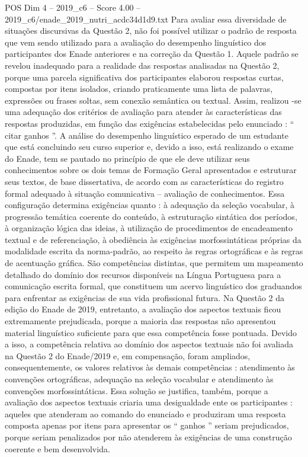 \begin{textsample}{POS Dim 4 – 2019\_c6 – Score 4.00 – 2019\_c6/enade\_2019\_nutri\_acdc34d1d9.txt}
Para avaliar essa diversidade de situações discursivas da Questão 2, não foi possível utilizar o padrão de resposta que vem sendo utilizado para a avaliação do desempenho linguístico dos participantes dos Enade anteriores e na correção da Questão 1.
Aquele padrão se revelou inadequado para a realidade das respostas analisadas na Questão 2, porque uma parcela significativa dos participantes elaborou respostas curtas, compostas por itens isolados, criando praticamente uma lista de palavras, expressões ou frases soltas, sem conexão semântica ou textual.
Assim, realizou -se uma adequação dos critérios de avaliação para atender às características das respostas produzidas, em função das exigências estabelecidas pelo enunciado : “ citar ganhos ”.
A análise do desempenho linguístico esperado de um estudante que está concluindo seu curso superior e, devido a isso, está realizando o exame do Enade, tem se pautado no princípio de que ele deve utilizar seus conhecimentos sobre os dois temas de Formação Geral apresentados e estruturar seus textos, de base dissertativa, de acordo com as características do registro formal adequado à situação comunicativa – avaliação de conhecimentos.
Essa configuração determina exigências quanto : à adequação da seleção vocabular, à progressão temática coerente do conteúdo, à estruturação sintática dos períodos, à organização lógica das ideias, à utilização de procedimentos de encadeamento textual e de referenciação, à obediência às exigências morfossintáticas próprias da modalidade escrita da norma-padrão, ao respeito às regras ortográficas e às regras de acentuação gráfica.
São competências distintas, que permitem um mapeamento detalhado do domínio dos recursos disponíveis na Língua Portuguesa para a comunicação escrita formal, que constituem um acervo linguístico dos graduandos para enfrentar as exigências de sua vida profissional futura.
Na Questão 2 da edição do Enade de 2019, entretanto, a avaliação dos aspectos textuais ficou extremamente prejudicada, porque a maioria das respostas não apresentou material linguístico suficiente para que essa competência fosse pontuada.
Devido a isso, a competência relativa ao domínio dos aspectos textuais não foi avaliada na Questão 2 do Enade/2019 e, em compensação, foram ampliados, consequentemente, os valores relativos às demais competências : atendimento às convenções ortográficas, adequação na seleção vocabular e atendimento às convenções morfossintáticas.
Essa solução se justifica, também, porque a avaliação dos aspectos textuais criaria uma desigualdade ente os participantes : aqueles que atenderam ao comando do enunciado e produziram uma resposta composta apenas por itens para apresentar os “ ganhos ” seriam prejudicados, porque seriam penalizados por não atenderem às exigências de uma construção coerente e bem desenvolvida.

\end{textsample}

